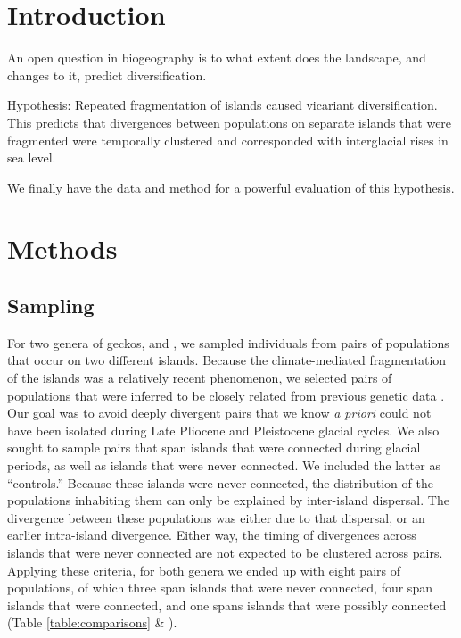 \section{Introduction}

An open question in biogeography is to what extent does the landscape, and
changes to it, predict diversification.

Hypothesis: Repeated fragmentation of islands caused vicariant diversification.
This predicts that divergences between populations on separate islands that
were fragmented were temporally clustered and corresponded with interglacial
rises in sea level.

We finally have the data and method for a powerful evaluation of this
hypothesis.


\section{Methods}

\subsection{Sampling}
For two genera of geckos,  and , we sampled
individuals from pairs of populations that occur on two different islands.
Because the climate-mediated fragmentation of the islands was a relatively
recent phenomenon, we selected pairs of populations that were inferred to be
closely related from previous genetic data \citep{Siler2012, Siler2014kikuchii,
    Welton2010, Welton2010zootaxa, Siler2010}.
Our goal was to avoid deeply divergent pairs that we know \emph{a priori} could
not have been isolated during Late Pliocene and Pleistocene glacial cycles.
We also sought to sample pairs that span islands that were connected during
glacial periods, as well as islands that were never connected.
We included the latter as ``controls.''
Because these islands were never connected, the distribution of the populations
inhabiting them can only be explained by inter-island dispersal.
The divergence between these populations was either due to that
dispersal, or an earlier intra-island divergence.
Either way, the timing of divergences across islands that were never connected
are not expected to be clustered across pairs.
Applying these criteria, for both genera we ended up with eight pairs of
populations, of which three span islands that were never connected, four span
islands that were connected, and one spans islands that were possibly connected
(Table \ref{table:comparisons} \& ).

